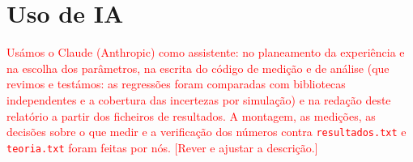 \documentclass[10pt,twocolumn,a4paper]{article}
\newcommand{\confirmar}[1]{\textcolor{red}{#1}}   %
\begin{document}
\section{Uso de IA}
\confirmar{Usámos o Claude (Anthropic) como assistente: no planeamento da experiência e na escolha dos
parâmetros, na escrita do código de medição e de análise (que revimos e testámos: as regressões foram
comparadas com bibliotecas independentes e a cobertura das incertezas por simulação) e na redação
deste relatório a partir dos ficheiros de resultados. A montagem, as medições, as decisões sobre o
que medir e a verificação dos números contra \texttt{resultados.txt} e \texttt{teoria.txt} foram feitas
por nós. [Rever e ajustar a descrição.]}
\end{document}
